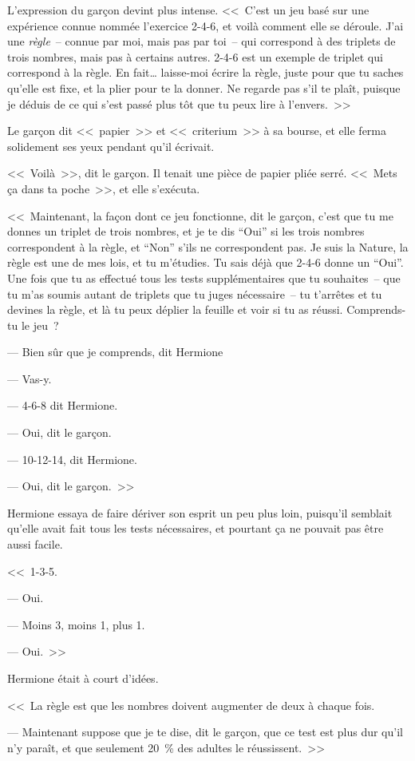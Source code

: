 L'expression du garçon devint plus intense. <<~C'est un jeu basé sur une expérience connue nommée l'exercice 2-4-6, et voilà comment elle se déroule. J'ai une \emph{règle}~-- connue par moi, mais pas par toi~-- qui correspond à des triplets de trois nombres, mais pas à certains autres. 2-4-6 est un exemple de triplet qui correspond à la règle. En fait… laisse-moi écrire la règle, juste pour que tu saches qu'elle est fixe, et la plier pour te la donner. Ne regarde pas s'il te plaît, puisque je déduis de ce qui s'est passé plus tôt que tu peux lire à l'envers.~>>

Le garçon dit <<~papier~>> et <<~criterium~>> à sa bourse, et elle ferma solidement ses yeux pendant qu'il écrivait.

<<~Voilà~>>, dit le garçon. Il tenait une pièce de papier pliée serré. <<~Mets ça dans ta poche~>>, et elle s'exécuta.

<<~Maintenant, la façon dont ce jeu fonctionne, dit le garçon, c'est que tu me donnes un triplet de trois nombres, et je te dis “Oui” si les trois nombres correspondent à la règle, et “Non” s'ils ne correspondent pas. Je suis la Nature, la règle est une de mes lois, et tu m'étudies. Tu sais déjà que 2-4-6 donne un “Oui”. Une fois que tu as effectué tous les tests supplémentaires que tu souhaites~-- que tu m'as soumis autant de triplets que tu juges nécessaire~-- tu t'arrêtes et tu devines la règle, et là tu peux déplier la feuille et voir si tu as réussi. Comprends-tu le jeu~?

--- Bien sûr que je comprends, dit Hermione

--- Vas-y.

--- 4-6-8 dit Hermione.

--- Oui, dit le garçon.

--- 10-12-14, dit Hermione.

--- Oui, dit le garçon.~>>

Hermione essaya de faire dériver son esprit un peu plus loin, puisqu'il semblait qu'elle avait fait tous les tests nécessaires, et pourtant ça ne pouvait pas être aussi facile.

<<~1-3-5.

--- Oui.

--- Moins 3, moins 1, plus 1.

--- Oui.~>>

Hermione était à court d'idées.

<<~La règle est que les nombres doivent augmenter de deux à chaque fois.

--- Maintenant suppose que je te dise, dit le garçon, que ce test est plus dur qu'il n'y paraît, et que seulement 20~\% des adultes le réussissent.~>>

